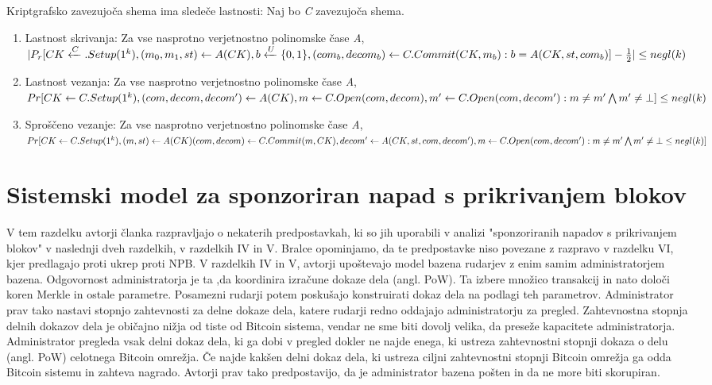 \documentclass{acm_proc_article-sp}
\begin{document}
\newline
\indent Kriptgrafsko zavezujoča shema ima sledeče lastnosti:
\indent Naj bo \textit{C} zavezujoča shema.
\begin{enumerate}
	\item Lastnost skrivanja: Za vse nasprotno verjetnostno polinomske čase \textit{A},
	$|P_r[CK \xleftarrow C.Setup(1^k),(m_0,m_1,st) \leftarrow A(CK), b \xleftarrow{U}  \\ \{0,1\},(com_b, decom_b) \leftarrow C.Commit(CK,m_b) : b = A(CK,st,com_b)] - \frac{1}{2}|  \le negl(k)$
	\item Lastnost vezanja: Za vse nasprotno verjetnostno polinomske čase \textit{A},
	$ Pr[CK \leftarrow \\ C.Setup(1^k),(com,decom,decom') \leftarrow A(CK),m \leftarrow C.Open(com,decom), m' \leftarrow \\ C.Open(com,decom') : m \ne m' \bigwedge m' \ne \bot ] \le negl(k)  $
	\item Sproščeno vezanje: Za vse nasprotno verjetnostno polinomske čase \textit{A},
	$ Pr[CK \leftarrow C.Setup(1^k) , (m,st) \leftarrow A(CK) (com,decom) \leftarrow C.Commit(m,CK), decom' \leftarrow A(CK,st,com,decom'), m \leftarrow \\ C.Open(com,decom') : m \ne m' \bigwedge m' \ne \bot \le negl(k)] $
\end{enumerate}

\section{Sistemski model  za sponzoriran napad s prikrivanjem blokov}

V tem razdelku avtorji članka razpravljajo  o nekaterih predpostavkah, ki so jih uporabili v analizi "sponzoriranih napadov s prikrivanjem blokov" v naslednji dveh razdelkih, v razdelkih IV in V. Bralce opominjamo, da te predpostavke niso povezane z razpravo v razdelku VI, kjer predlagajo proti ukrep proti NPB. V razdelkih IV in V, avtorji upoštevajo model bazena rudarjev z enim samim administratorjem bazena. Odgovornost administratorja je ta ,da koordinira izračune dokaze dela (angl. PoW). Ta izbere množico transakcij in nato določi koren Merkle in ostale parametre. Posamezni rudarji potem poskušajo konstruirati dokaz dela na podlagi teh parametrov. Administrator prav tako nastavi stopnjo zahtevnosti za delne dokaze dela, katere rudarji redno oddajajo administratorju za pregled. Zahtevnostna stopnja delnih dokazov dela je običajno nižja od tiste od Bitcoin sistema, vendar ne sme biti dovolj velika, da preseže kapacitete administratorja. Administrator pregleda vsak delni dokaz dela, ki ga dobi v pregled dokler ne najde enega, ki ustreza zahtevnostni stopnji dokaza o delu (angl. PoW) celotnega Bitcoin omrežja. Če najde kakšen delni dokaz dela, ki ustreza ciljni zahtevnostni stopnji Bitcoin omrežja ga odda Bitcoin sistemu in zahteva nagrado. Avtorji prav tako predpostavijo, da je administrator bazena pošten in da ne more biti skorupiran.
\end{document}
